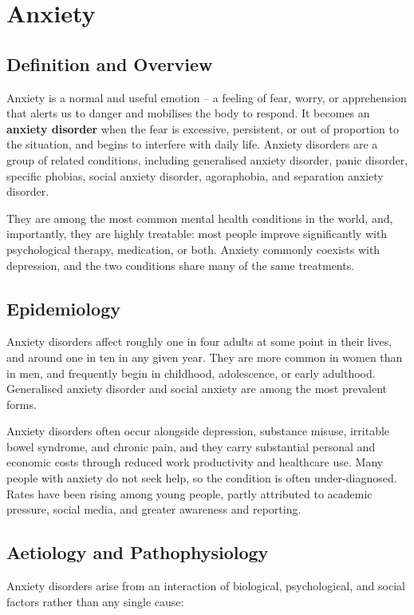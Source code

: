 \chapter{Anxiety}

\section*{Definition and Overview}
Anxiety is a normal and useful emotion -- a feeling of fear, worry, or apprehension that alerts us to danger and mobilises the body to respond. It becomes an \textbf{anxiety disorder} when the fear is excessive, persistent, or out of proportion to the situation, and begins to interfere with daily life. Anxiety disorders are a group of related conditions, including generalised anxiety disorder, panic disorder, specific phobias, social anxiety disorder, agoraphobia, and separation anxiety disorder.

They are among the most common mental health conditions in the world, and, importantly, they are highly treatable: most people improve significantly with psychological therapy, medication, or both. Anxiety commonly coexists with depression, and the two conditions share many of the same treatments.

\section*{Epidemiology}
Anxiety disorders affect roughly one in four adults at some point in their lives, and around one in ten in any given year. They are more common in women than in men, and frequently begin in childhood, adolescence, or early adulthood. Generalised anxiety disorder and social anxiety are among the most prevalent forms.

Anxiety disorders often occur alongside depression, substance misuse, irritable bowel syndrome, and chronic pain, and they carry substantial personal and economic costs through reduced work productivity and healthcare use. Many people with anxiety do not seek help, so the condition is often under-diagnosed. Rates have been rising among young people, partly attributed to academic pressure, social media, and greater awareness and reporting.

\section*{Aetiology and Pathophysiology}
Anxiety disorders arise from an interaction of biological, psychological, and social factors rather than any single cause:

